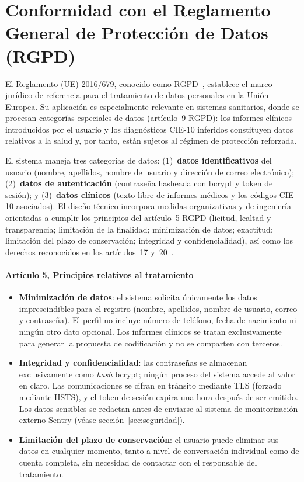 \chapter{Conformidad con el Reglamento General de Protección de Datos (RGPD)}
\label{cap:AnexoP}

El Reglamento (UE) 2016/679, conocido como RGPD~\cite{RGPD16}, establece el marco jurídico de referencia para el tratamiento de datos personales en la Unión Europea. Su aplicación es especialmente relevante en sistemas sanitarios, donde se procesan categorías especiales de datos (artículo~9 RGPD): los informes clínicos introducidos por el usuario y los diagnósticos CIE-10 inferidos constituyen datos relativos a la salud y, por tanto, están sujetos al régimen de protección reforzada.

El sistema maneja tres categorías de datos: (1)~\textbf{datos identificativos} del usuario (nombre, apellidos, nombre de usuario y dirección de correo electrónico); (2)~\textbf{datos de autenticación} (contraseña hasheada con bcrypt y token de sesión); y (3)~\textbf{datos clínicos} (texto libre de informes médicos y los códigos CIE-10 asociados). El diseño técnico incorpora medidas organizativas y de ingeniería orientadas a cumplir los principios del artículo~5 RGPD (licitud, lealtad y transparencia; limitación de la finalidad; minimización de datos; exactitud; limitación del plazo de conservación; integridad y confidencialidad), así como los derechos reconocidos en los artículos~17 y~20~\cite{RGPD16}.

\subsubsection{Artículo 5, Principios relativos al tratamiento}

\begin{itemize}
 \item \textbf{Minimización de datos}: el sistema solicita únicamente los datos imprescindibles para el registro (nombre, apellidos, nombre de usuario, correo y contraseña). El perfil no incluye número de teléfono, fecha de nacimiento ni ningún otro dato opcional. Los informes clínicos se tratan exclusivamente para generar la propuesta de codificación y no se comparten con terceros.
 \item \textbf{Integridad y confidencialidad}: las contraseñas se almacenan exclusivamente como \emph{hash} bcrypt; ningún proceso del sistema accede al valor en claro. Las comunicaciones se cifran en tránsito mediante TLS (forzado mediante HSTS), y el token de sesión expira una hora después de ser emitido. Los datos sensibles se redactan antes de enviarse al sistema de monitorización externo Sentry (véase sección~\ref{sec:seguridad}).
 \item \textbf{Limitación del plazo de conservación}: el usuario puede eliminar sus datos en cualquier momento, tanto a nivel de conversación individual como de cuenta completa, sin necesidad de contactar con el responsable del tratamiento.
\end{itemize}

